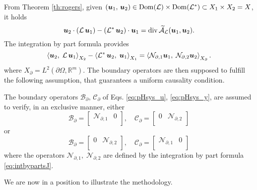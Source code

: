 From Theorem \ref{th:rogers}, given $(\bm{u}_1, \, \bm{u}_2) \in \Dom(\mathcal{L}) \times \Dom(\mathcal{L}^*) \subset X_1 \times X_2 = X$, it holds
\begin{equation}
{\bm{u}_2} \cdot {(\mathcal{L}\, \bm{u}_1)}  - {(\mathcal{L}^* \, \bm{u}_2)} \cdot {\bm{u}_1} = \div \widetilde{\mathcal{A}}_{\mathcal{L}}(\bm{u}_1, \bm{u}_2). \\
\end{equation}
The integration by part formula provides 
\begin{equation}
 \inner[X_2]{\bm{u}_2}{\mathcal{L}\,\bm{u}_1} - \inner[X_1]{\mathcal{L}^* \, \bm{u}_2}{\bm{u}_1} = \inner[X_\partial]{\mathcal{N}_{\partial, 1} \bm{u}_1}{\mathcal{N}_{\partial, 2} \bm{u}_2}. \label{eq:intbypartsJ} 
\end{equation}
where $X_\partial = L^2(\partial \Omega, \mathbb{R}^m)$. The boundary operators are then supposed to fulfill the following assumption, that guarantees a uniform causality condition.

\begin{assumption}\label{ass:operBC}
	 The boundary operators $\mathcal{B}_\partial, \, \mathcal{C}_\partial$ of Eqs. \eqref{eq:pHsys_u}, \eqref{eq:pHsys_y}, are assumed to verify, in an exclusive manner, either
	 \begin{equation}\label{eq:assB1C2}
	 \mathcal{B}_\partial = \begin{bmatrix}
	 \mathcal{N}_{\partial, 1} & 0 \\
	 \end{bmatrix}, \quad \mathcal{C}_\partial = \begin{bmatrix}
	 0 & \mathcal{N}_{\partial, 2} \\
	 \end{bmatrix}
	 \end{equation}
	or 
	\begin{equation}\label{eq:assB2C1}
	\mathcal{B}_\partial = \begin{bmatrix}
	0 & \mathcal{N}_{\partial, 2} \\
	\end{bmatrix}, \quad 
	\mathcal{C}_\partial = \begin{bmatrix}
	\mathcal{N}_{\partial, 1} & 0 \\
	\end{bmatrix}
	\end{equation}
	where the operators $\mathcal{N}_{\partial, 1}, \; \mathcal{N}_{\partial, 2}$ are defined by the integration by part formula \eqref{eq:intbypartsJ}. 

\end{assumption}
We are now in a position to illustrate the methodology. 
